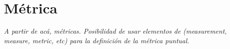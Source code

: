 \section{Métrica}

\textit{A partir de acá, métricas.
Posibilidad de usar elementos de (measurement, measure, metric, etc) para la definición de
la métrica puntual.}
